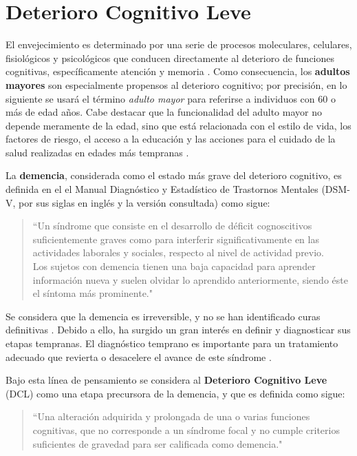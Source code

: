 
\section{Deterioro Cognitivo Leve}
\label{seccion:dcl}

El envejecimiento es determinado por una serie de procesos moleculares, celulares, fisiológicos y psicológicos que conducen directamente al deterioro de funciones cognitivas, específicamente atención y memoria \cite{Park09}.
%
Como consecuencia, los \textbf{adultos mayores} son especialmente propensos al deterioro cognitivo; por precisión, en lo siguiente se usará el término \textit{adulto mayor} para referirse a individuos con 60 o más de edad años.
%
Cabe destacar que la funcionalidad del adulto mayor no depende meramente de la edad, sino que está relacionada con el estilo de vida, los factores de riesgo, el acceso a la educación y las acciones para el cuidado de la salud realizadas en edades más tempranas \cite{Sanhueza14}.
 
La \textbf{demencia}, considerada como el estado más grave del deterioro cognitivo, es definida en el el Manual Diagnóstico y Estadístico de Trastornos Mentales (DSM-V, por sus siglas en inglés y la versión consultada) como sigue:
\begin{quote}
``Un síndrome que consiste en el desarrollo de déficit cognoscitivos suficientemente graves como para 
interferir significativamente en las actividades laborales y sociales, respecto al nivel de 
actividad previo.\\
%
Los sujetos con demencia tienen una baja capacidad para aprender información nueva y suelen olvidar 
lo aprendido anteriormente, siendo éste el síntoma más prominente."  \cite{DCM5}
\end{quote}

Se considera que la demencia es irreversible, y no se han identificado curas definitivas \cite{PlanAlzheimer04}. 
%
Debido a ello, ha surgido un gran interés en definir y diagnosticar sus etapas tempranas. 
%
El diagnóstico temprano es importante para un tratamiento adecuado que revierta o desacelere el avance de este síndrome \cite{Knopman01}.

Bajo esta línea de pensamiento se considera al \textbf{Deterioro Cognitivo Leve} (DCL) como una etapa precursora de la demencia, y que es definida como sigue: 
\begin{quote}
``Una alteración adquirida y prolongada de una o varias funciones cognitivas, que no corresponde a un 
síndrome focal y no cumple criterios suficientes de gravedad para ser calificada como demencia."
\cite{Robles02}
\end{quote}

